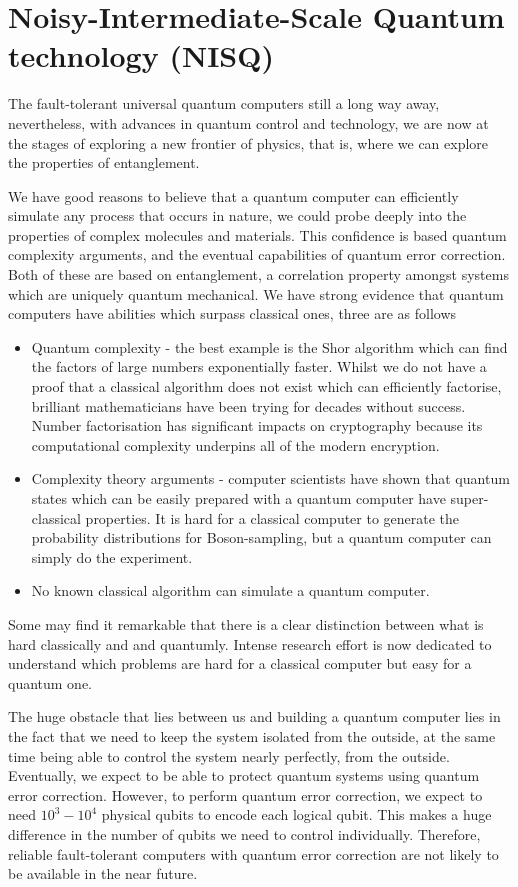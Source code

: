 \section{Noisy-Intermediate-Scale Quantum technology (NISQ)}

The fault-tolerant universal quantum computers still a long way away, nevertheless, 
with advances in quantum control and technology,
we are now at the stages of exploring a new frontier of physics, that is, where we can
explore the properties of entanglement.

We have good reasons to believe that a quantum computer can efficiently simulate any process that occurs in nature, we could probe deeply into the properties of complex molecules and materials. This confidence is based quantum complexity arguments, and the eventual capabilities of quantum error correction. Both of these are based on entanglement, a correlation property amongst systems which are uniquely quantum mechanical. We have strong evidence that quantum computers have abilities which surpass classical ones, three are as follows
\begin{itemize}
\item Quantum complexity - the best example is the Shor algorithm \cite{} which can find the factors of large numbers exponentially faster. Whilst we do not have a proof that a classical algorithm does not exist which can efficiently factorise, brilliant mathematicians have been trying for decades without success. Number factorisation has significant impacts on cryptography because its computational complexity underpins all of the modern encryption. 
% 
\item Complexity theory arguments - computer scientists have shown that quantum states which can be easily prepared with a quantum computer have super-classical properties. It is hard for a classical computer to generate the probability distributions for Boson-sampling, but a quantum computer can simply do the experiment.
% 
\item No known classical algorithm can simulate a quantum computer.
\end{itemize}

Some may find it remarkable that there is a clear distinction between what is hard classically and and quantumly. Intense research effort is now dedicated to understand which problems are hard for a classical computer but easy for a quantum one.


The huge obstacle that lies between us and building a quantum computer lies in the fact that we need to keep the system isolated from the outside, at the same time being able to control the system nearly perfectly, from the outside. Eventually, we expect to be able to protect quantum systems using quantum error correction. However, to perform quantum error correction, we expect to need $10^3 - 10^4$ physical qubits to encode each logical qubit. This makes a huge difference in the number of qubits we need to control individually. Therefore, reliable fault-tolerant computers with quantum error correction are not likely to be available in the near future.



